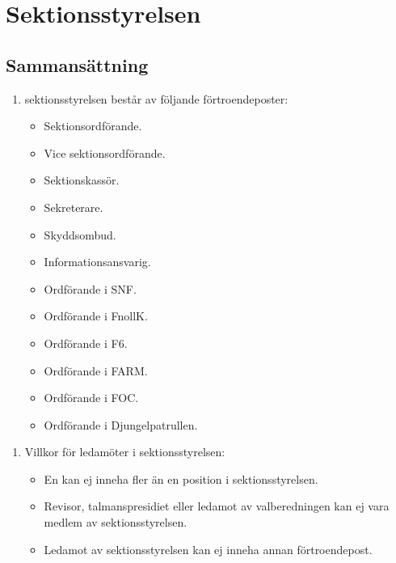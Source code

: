 \documentclass[11pt,a4paper]{article}
\begin{document}
\newpage

\section{Sektionsstyrelsen}

\subsection{Sammansättning}

\begin{enumerate}[\thesubsection .1]

  \item sektionsstyrelsen består av följande förtroendeposter:
    \begin{itemize}
      \item Sektionsordförande.
      \item Vice sektionsordförande.
      \item Sektionskassör.
      \item Sekreterare.
      \item Skyddsombud.
      \item Informationsansvarig.
      \item Ordförande i SNF.
      \item Ordförande i FnollK.
      \item Ordförande i F6.
      \item Ordförande i FARM.
      \item Ordförande i FOC.
      \item Ordförande i Djungelpatrullen.
    \end{itemize}

\end{enumerate}

\begin{enumerate}[\thesubsection .2]
\item Villkor för ledamöter i sektionsstyrelsen:

\begin{itemize}
\item En kan ej inneha fler än en position i sektionsstyrelsen.
\item Revisor, talmanspresidiet eller ledamot av valberedningen kan ej vara medlem av sektionsstyrelsen.
\item Ledamot av sektionsstyrelsen kan ej inneha annan förtroendepost.
\end{itemize}

\end{enumerate}
\end{document}
